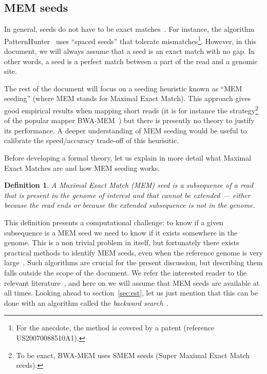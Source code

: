 \documentclass{article}
\newtheorem{definition}{Definition}
\begin{document}
\subsection{MEM seeds}

In general, seeds do not have to be exact matches~\cite{pmid20460430}. For
instance, the algorithm PatternHunter~\cite{pmid11934743} uses ``spaced
seeds'' that tolerate mismatches\footnote{For the anecdote, the method is
covered by a patent (reference US20070088510A1).}. However, in this
document, we will always assume that a seed is an exact match with no gap.
In other words, a seed is a perfect match between a part of the read and a
genomic site.

The rest of the document will focus on a seeding heuristic known as ``MEM
seeding'' (where MEM stands for Maximal Exact Match). This approach gives
good empirical results when mapping short reads (it is for instance the
strategy\footnote{To be exact, BWA-MEM uses SMEM seeds (Super Maximal
Exact Match seeds).} of the popular mapper BWA-MEM~\cite{li2013aligning})
but there is presently no theory to justify its performance. A deeper
understanding of MEM seeding would be useful to calibrate the
speed/accuracy trade-off of this heurisitic.

Before developing a formal theory, let us explain in more detail what
Maximal Exact Matches are and how MEM seeding works.

\begin{definition}
A Maximal Exact Match (MEM) seed is a subsequence of a read that is
present in the genome of interest and that cannot be extended --- either
because the read ends or because the extended subsequence is not in the
genome.
\end{definition}

This definition presents a computational challenge: to know if a given
subsequence is a MEM seed we need to know if it exists somewhere in the
genome. This is a non trivial problem in itself, but fortunately there
exists practical methods to identify MEM seeds, even when the reference
genome is very large~\cite{ferragina2000opportunistic,
ferragina2005indexing}. Such algorithms are crucial for the present
discussion, but describing them falls outside the scope of the document.
We refer the interested reader to the relevant
literature~\cite{pmid24336412,pmid25399029,pmid23349213,pmid19389736,
li2013aligning}, and here on we will assume that MEM seeds are available
at all times. Looking ahead to section~\ref{sec:est}, let us just mention
that this can be done with an algorithm called the \emph{backward
search}~\cite{ferragina2000opportunistic}.
\end{document}
